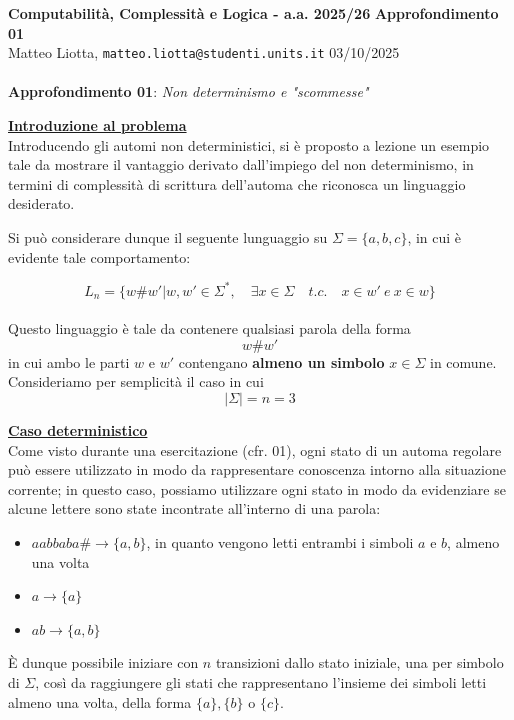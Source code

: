 \documentclass[a4paper,10pt]{article}
\newcommand{\EsercitazioneNum}{01}
\newcommand{\Data}{03/10/2025}
\begin{document}
\footnotesize  %

\noindent
\small \textbf{Computabilità, Complessità e Logica - a.a. 2025/26} \hfill \textbf{Approfondimento \EsercitazioneNum} \\[0.2cm]
\scriptsize Matteo Liotta, \texttt{matteo.liotta@studenti.units.it} \hfill \Data \\[0.2cm]

\noindent\makebox[\linewidth]{\rule{\linewidth}{0.4pt}} \\[1cm]


\noindent\Large \textbf{Approfondimento \EsercitazioneNum}: \textit{Non determinismo e "scommesse"}\\[0cm]

\small

\underline{\textbf{Introduzione al problema}}\\[0.3cm]
Introducendo gli automi non deterministici, si è proposto a lezione un esempio tale da mostrare il vantaggio derivato dall'impiego del non determinismo, in termini di complessità di scrittura dell'automa che riconosca un linguaggio desiderato.

Si può considerare dunque il seguente lunguaggio su $\Sigma=\{a,b,c\}$, in cui è evidente tale comportamento:

$$L_n=\{w\#w'| w,w'\in\Sigma^*, \quad \exists x\in \Sigma \quad t.c.\quad  x\in w'\ e\ x\in w\}$$\\[0.01cm]
Questo linguaggio è tale da contenere qualsiasi parola della forma $$w\#w'$$ in cui ambo le parti $w$ e $w'$ contengano \textbf{almeno un simbolo} $x\in \Sigma$ in comune. Consideriamo per semplicità il caso in cui $$|\Sigma|=n=3$$

\underline{\textbf{Caso deterministico}}\\[0.3cm]
Come visto durante una esercitazione (cfr. 01), ogni stato di un automa regolare può essere utilizzato in modo da rappresentare conoscenza intorno alla situazione corrente; in questo caso, possiamo utilizzare ogni stato in modo da evidenziare se alcune lettere sono state incontrate all'interno di una parola: 

\begin{itemize}
    \item $aabbaba\# \rightarrow \{a,b\} $, in quanto vengono letti entrambi i simboli $a$ e $b$, almeno una volta
    \item $a \rightarrow \{a\}$
    \item $ab \rightarrow \{a,b\}$
\end{itemize}
È dunque possibile iniziare con $n$ transizioni dallo stato iniziale, una per simbolo di $\Sigma$, così da raggiungere gli stati che rappresentano l'insieme dei simboli letti almeno una volta, della forma $\{a\}, \{b\} $ o $\{c\}$.
\end{document}
